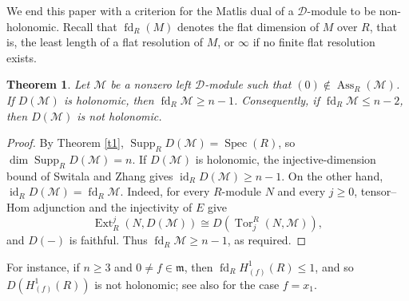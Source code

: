 \documentclass[11pt]{amsart}
\newtheorem{theorem}{Theorem}[section]
\theoremstyle{definition}
\newcommand{\m}{\mathfrak m}
\newcommand{\D}{\mathcal D}
\newcommand{\M}{\mathcal M}
\DeclareMathOperator{\Ass}{Ass}
\DeclareMathOperator{\Supp}{Supp}
\DeclareMathOperator{\Spec}{Spec}
\begin{document}

We end this paper with a criterion for the Matlis dual of a $\D$-module to be non-holonomic. Recall that $\operatorname{fd}_R(M)$ denotes the flat dimension of $M$ over $R$, that is, the least length of a flat resolution of $M$, or $\infty$ if no finite flat resolution exists.
\begin{theorem}
Let $\M$ be a nonzero left $\D$-module such that $(0)\notin\Ass_R(\M)$. If $D(\M)$ is holonomic, then $\operatorname{fd}_R \M\geq n-1$. Consequently, if $\operatorname{fd}_R \M\leq n-2$, then $D(\M)$ is not holonomic.
\end{theorem}
\begin{proof}
By Theorem \ref{t1}, $\Supp_R D(\M)=\Spec(R)$, so $\dim\Supp_R D(\M)=n$. If $D(\M)$ is holonomic, the injective-dimension bound of Switala and Zhang \cite[ Theorem 6.2]{SZ} gives $\operatorname{id}_R D(\M)\geq n-1$. On the other hand, $\operatorname{id}_R D(\M)=\operatorname{fd}_R \M$. Indeed, for every $R$-module $N$ and every $j\geq0$, tensor--Hom adjunction and the injectivity of $E$ give
\[
\operatorname{Ext}_R^j(N,D(\M))
\cong D(\operatorname{Tor}_j^R(N,\M)),
\]
and $D(-)$ is faithful. Thus $\operatorname{fd}_R \M\geq n-1$, as required.
\end{proof}
For instance, if $n\ge 3$ and $0\neq f\in\m$, then $\operatorname{fd}_R H^1_{(f)}(R)\le 1$, and so $D(H^1_{(f)}(R))$ is not holonomic; see also \cite[Example 2.9]{SZ18} for the case $f=x_1$.
\end{document}

